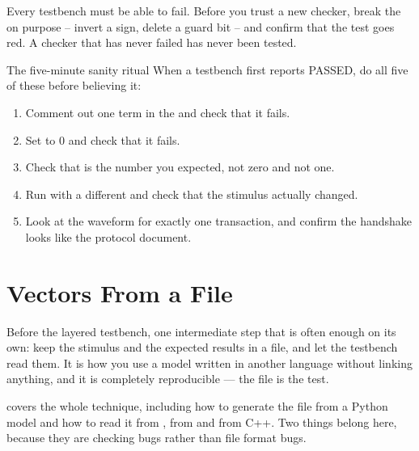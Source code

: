 \begin{ruleofthumb}
Every testbench must be able to fail. Before you trust a new checker, break the
\DUT{} on purpose -- invert a sign, delete a guard bit -- and confirm that the
test goes red. A checker that has never failed has never been tested.
\end{ruleofthumb}

\begin{tipbox}{The five-minute sanity ritual}
When a testbench first reports PASSED, do all five of these before believing
it:
\begin{enumerate}
\item Comment out one term in the \DUT{} and check that it fails.
\item Set  to 0 and check that it fails.
\item Check that  is the number you expected, not zero and
  not one.
\item Run with a different  and check that the stimulus
  actually changed.
\item Look at the waveform for exactly one transaction, and confirm the
  handshake looks like the protocol document.
\end{enumerate}
\end{tipbox}
\section{Vectors From a File}
\label{sec:tb:vectors}

Before the layered testbench, one intermediate step that is often enough on
its own: keep the stimulus and the expected results in a file, and let the
testbench read them. It is how you use a model written in another language
without linking anything, and it is completely reproducible --- the file is
the test.

\Refsimulationbook covers the whole technique, including how to generate the
file from a Python model and how to read it from \SV{}, from \VHDL{} and from
C++. Two things belong here, because they are checking bugs rather than file
format bugs.


